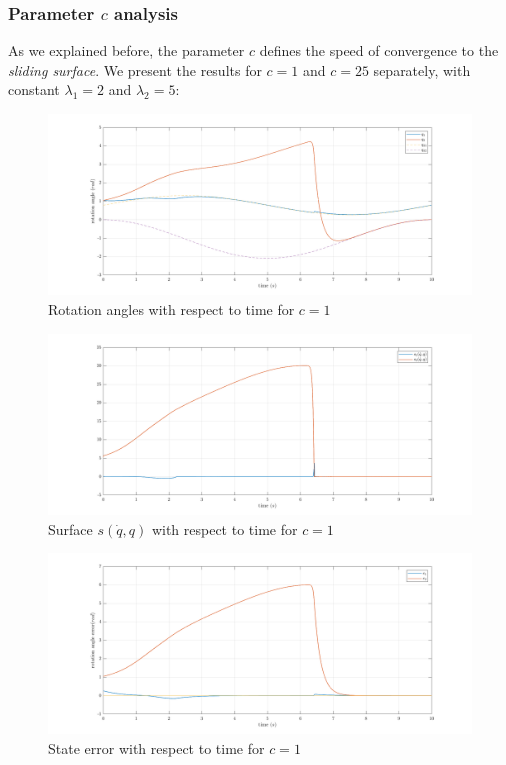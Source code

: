 \documentclass[a4paper]{article}
\begin{document}
\subsubsection{Parameter $c$ analysis}
As we explained before, the parameter $c$ defines the speed of convergence to the \textit{sliding surface}.
We present the results for $c=1$ and $c=25$ separately, with constant $\lambda_1 = 2$ and $\lambda_2 = 5$:
\begin{figure}[H]
    \centering
    \includegraphics[width=15cm]{fig/sim2/c1/q1.png}
    \caption{Rotation angles with respect to time for $c=1$}
\end{figure}
\begin{figure}[H]
    \centering
    \includegraphics[width=15cm]{fig/sim2/c1/s1.png}
    \caption{Surface $s(\dot{q}, q)$ with respect to time for $c=1$}
\end{figure}
\begin{figure}[H]
    \centering
    \includegraphics[width=15cm]{fig/sim2/c1/e1.png}
    \caption{State error with respect to time for $c=1$}
\end{figure}
\end{document}
